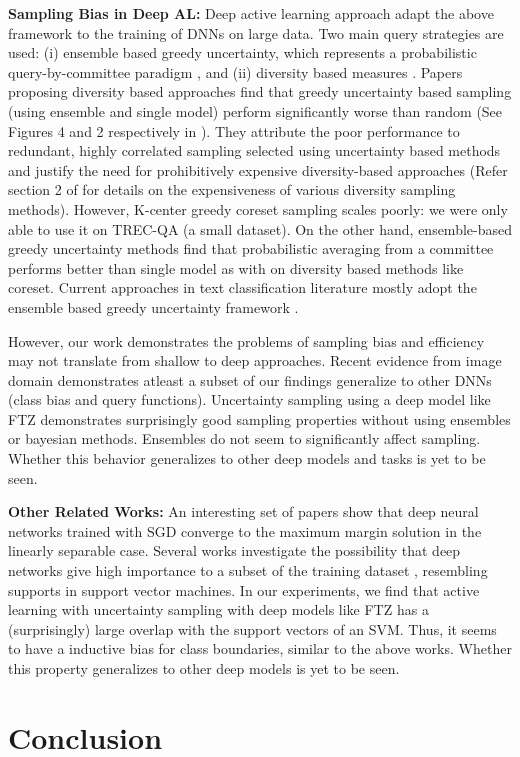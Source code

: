\documentclass[11pt,a4paper]{article}
\begin{document}
\textbf{Sampling Bias in Deep AL:} Deep active learning approach adapt the above framework to the training of DNNs on large data. Two main query strategies are used: (i) ensemble based greedy uncertainty, which represents a probabilistic query-by-committee paradigm \cite{gal2017deep, beluch2018power}, and (ii) diversity based measures \cite{sener2018active,ducoffe2018adversarial}. Papers proposing diversity based approaches find that greedy uncertainty based sampling (using ensemble and single model) perform significantly worse than random (See Figures 4 and 2 respectively in \cite{sener2018active,ducoffe2018adversarial}). They attribute the poor performance to redundant, highly correlated sampling selected using uncertainty based methods and justify the need for  prohibitively expensive diversity-based approaches (Refer section 2 of \cite{sener2018active} for details on the expensiveness of various diversity sampling methods). However, K-center greedy coreset sampling scales poorly: we were only able to use it on TREC-QA (a small dataset). On the other hand, ensemble-based greedy uncertainty methods find that probabilistic averaging from a committee \cite{gal2017deep,beluch2018power} performs better than single model as with on diversity based methods like coreset\cite{gissin2019discriminative, beluch2018power}. Current approaches in text classification literature mostly adopt the ensemble based greedy uncertainty framework \cite{siddhant2018deep, lowell2018transferable, zhang2017active}. 

However, our work demonstrates the problems of sampling bias and efficiency may not translate from shallow to deep approaches.  Recent evidence from image domain \cite{gissin2019discriminative} demonstrates atleast a subset of our findings generalize to other DNNs (class bias and query functions). Uncertainty sampling using a deep model like FTZ demonstrates surprisingly good sampling properties without using ensembles or bayesian methods. Ensembles do not seem to significantly affect sampling. Whether this behavior generalizes to other deep models and tasks is yet to be seen. 


\textbf{Other Related Works:} An interesting set of papers \cite{soudry2018implicit, xu2018convergence} show that deep neural networks trained with SGD converge to the maximum margin solution in the linearly separable case. Several works investigate the possibility that deep networks give high importance to a subset of the training dataset \cite{toneva19example, vodrahalli2018all, birodkar2019semantic}, resembling supports in support vector machines. In our experiments, we find that active learning with uncertainty sampling with deep models like FTZ has a (surprisingly) large overlap with the support vectors of an SVM. Thus, it seems to have a inductive bias for class boundaries, similar to the above works. Whether this property generalizes to other deep models is yet to be seen.  \section{Conclusion}\label{sec:conclusion}
\end{document}
